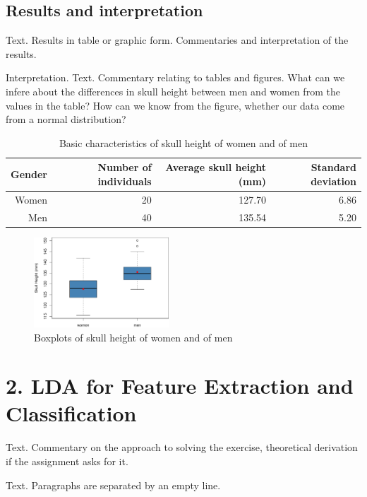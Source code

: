 \subsection*{Results and interpretation}
\noindent Text. Results in table or graphic form. Commentaries and interpretation of the results.

 Interpretation. Text. Commentary relating to tables and figures. What can we infere about the differences in skull height between men and women from the values in the table? How can we know from the figure, whether our data come from a normal distribution?

\begin{table}[ht]
\footnotesize
\centering

\begin{tabular}{r||rrr}
 Gender & Number of individuals & Average skull height (mm) & Standard deviation \\ 
 \hline \hline
Women & 20 & 127.70 & 6.86 \\ 
Men & 40 & 135.54 & 5.20 \\ 
\end{tabular}
\caption{Basic characteristics of skull height of women and of men}
\end{table}


\begin{figure}[ht]
\centering
\includegraphics[angle=0,width=0.45\textwidth]{boxplot-example.pdf}
\caption{Boxplots of skull height of women and of men}
\end{figure}

\newpage

\section*{2. LDA for Feature Extraction and Classification}
\noindent Text. Commentary on the approach to solving the exercise, theoretical derivation if the assignment asks for it.

Text. Paragraphs are separated by an empty line. 

